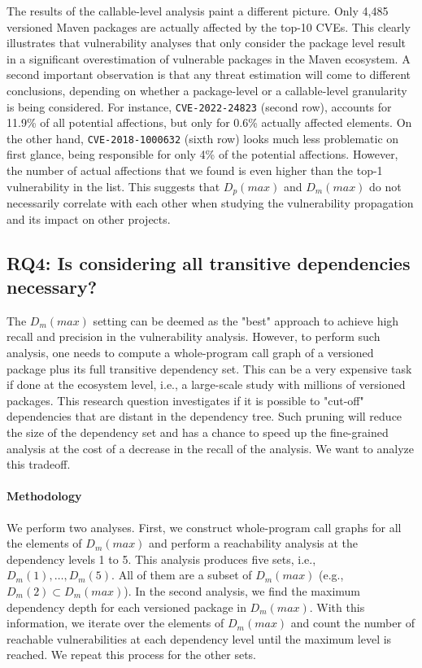The results of the callable-level analysis paint a different picture.
Only 4,485 versioned Maven packages are actually affected by the top-10 CVEs.
This clearly illustrates that vulnerability analyses that only consider the package level result in a significant overestimation of vulnerable packages in the Maven ecosystem.
A second important observation is that any threat estimation will come to different conclusions, depending on whether a package-level or a callable-level granularity is being considered.
For instance, \texttt{CVE-2022-24823} (second row), accounts for 11.9\% of all potential affections, but only for 0.6\% actually affected elements.
On the other hand, \texttt{CVE-2018-1000632} (sixth row) looks much less problematic on first glance, being responsible for only 4\% of the potential affections.
However, the number of actual affections that we found is even higher than the top-1 vulnerability in the list.
This suggests that $D_p(max)$ and $D_m(max)$ do not necessarily correlate with each other when studying the vulnerability propagation and its impact on other projects.

\subsection{\textbf{RQ4}: Is considering all transitive dependencies necessary?}
The ${D_{m}(max)}$ setting can be deemed as the "best" approach to achieve high recall and precision in the vulnerability analysis. However,
to perform such analysis, one needs to compute a whole-program call graph of a versioned package plus its full transitive dependency set. This can be a very expensive task if done at the ecosystem level, i.e., a large-scale study with millions of versioned packages.
This research question investigates if it is possible to "cut-off" dependencies that are distant in the dependency tree.
Such pruning will reduce the size of the dependency set and has a chance to speed up the fine-grained analysis at the cost of a decrease in the recall of the analysis.
We want to analyze this tradeoff.

\paragraph{Methodology}
We perform two analyses. First, we construct whole-program call graphs for all the elements of $D_{m}(max)$ and perform a reachability analysis at the dependency levels 1 to 5. This analysis produces five sets, i.e., $D_{m}(1), \dots, D_{m}(5)$. All of them are a subset of $D_{m}(max)$ (e.g., $D_{m}(2) \subset D_{m}(max)$).
%
In the second analysis, we find the maximum dependency depth for each versioned package in $D_m(max)$.
With this information, we iterate over the elements of $D_{m}(max)$ and count the number of reachable vulnerabilities at each dependency level until the maximum level is reached. We repeat this process for the other sets.%

